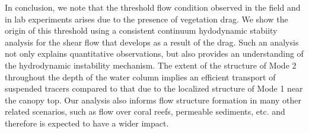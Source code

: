 \documentclass[aps,prl,reprint,twocolumn,showpacs,superscriptaddress,10pt]{revtex4-1}  %
\begin{document}
In conclusion, we note that the threshold flow condition observed in the field and in lab experiments arises due to the presence of vegetation drag. 
We show the origin of this threshold using a consistent continuum hydodynamic stabiity analysis for the shear flow that develops as a result of the drag. 
Such an analysis not only explains quantitative observations, but also provides an understanding of the hydrodynamic instability mechanism. 
The extent of the structure of Mode 2 throughout the depth of the water column implies an efficient transport of suspended tracers compared to that due to the localized structure of Mode 1 near the canopy top. 
Our analysis also informs flow structure formation in many other related scenarios, such as flow over coral reefs, permeable sediments, etc. and therefore is expected to have a wider impact.

{}

\end{document}
